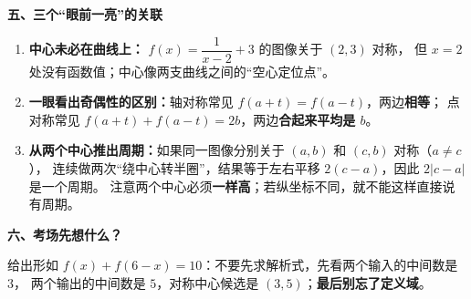 \clearpage
\begin{explanationbox}
\textbf{\textcolor{CExplanation}{五、三个“眼前一亮”的关联}}


\begin{enumerate}[leftmargin=*,itemsep=0.5em]
\item \textbf{中心未必在曲线上：} $f(x)=\dfrac{1}{x-2}+3$ 的图像关于 $(2,3)$ 对称，
但 $x=2$ 处没有函数值；中心像两支曲线之间的“空心定位点”。



\item \textbf{一眼看出奇偶性的区别：}轴对称常见 $f(a+t)=f(a-t)$，两边\textbf{相等}；
点对称常见 $f(a+t)+f(a-t)=2b$，两边\textbf{合起来平均是 $b$}。


\item \textbf{从两个中心推出周期：}如果同一图像分别关于 $(a,b)$ 和 $(c,b)$ 对称（$a\ne c$），
连续做两次“绕中心转半圈”，结果等于左右平移 $2(c-a)$，因此 $2|c-a|$ 是一个周期。
注意两个中心必须\textbf{一样高}；若纵坐标不同，就不能这样直接说有周期。
\end{enumerate}

\medskip

\end{explanationbox}
\clearpage
\begin{explanationbox}
\textbf{\textcolor{CExplanation}{六、考场先想什么？}}


给出形如 $f(x)+f(6-x)=10$：不要先求解析式，先看两个输入的中间数是 $3$，
两个输出的中间数是 $5$，对称中心候选是 $(3,5)$；\textbf{最后别忘了定义域}。
\end{explanationbox}
